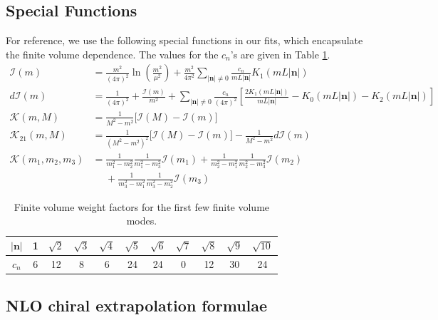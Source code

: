 \documentclass[prd,tightenlines,preprintnumbers,showpacs,superscriptaddress,notitlepage,eqsecnum,floatfix,notitlepage]{revtex4-1}
\begin{document}
\subsection{Special Functions}
For reference, we use the following special functions in our fits, which encapsulate the finite volume dependence. The values for the $c_n$'s are given in Table \ref{tab:cN_weights}.
\begin{align}
\mathcal{I}(m) &= \frac{m^2}{(4\pi)^2} \ln \left( \frac{m^2}{\mu^2} \right)
+ \frac{m^2}{4\pi^2} \sum_{|\mathbf{n}|\neq0} \frac{c_n}{mL|\mathbf{n}|} K_1(mL|\mathbf{n}|) \label{eqn:I(m)} \\
d\mathcal{I}(m) &=
\frac{1}{(4\pi)^2} + \frac{\mathcal{I}(m)}{m^2}
+\sum_{|\mathbf{n}|\neq0} \frac{c_n}{(4\pi)^2} \left[
\frac{2K_1(mL|\mathbf{n}|)}{mL|\mathbf{n}|}
-K_0(mL|\mathbf{n}|)
-K_2(mL|\mathbf{n}|)\right] \\
\mathcal{K}(m,M) &= \frac{1}{M^2 - m^2} \Big[ \mathcal{I}(M) - \mathcal{I}(m) \Big] \\
\mathcal{K}_{21}(m,M) &=
\frac{1}{(M^2 - m^2)^2} \Big[ \mathcal{I}(M) - \mathcal{I}(m) \Big]
-\frac{1}{M^2 - m^2} d\mathcal{I}(m) \\
\mathcal{K}(m_1,m_2,m_3) &= \frac{1}{m_1^2 - m_2^2}\frac{1}{m_1^2-m_3^2} \mathcal{I}(m_1)
+\frac{1}{m_2^2 - m_1^2} \frac{1}{m_2^2 - m_3^2} \mathcal{I}(m_2)
\nonumber\\&\phantom{=}
+\frac{1}{m_3^2 - m_1^2} \frac{1}{m_3^2 - m_2^2} \mathcal{I}(m_3)
\end{align}

\begin{table}
	\begin{ruledtabular}
		\begin{tabular}{c|cccccccccc}
			$|\mathbf{n}|$& 1 & $\sqrt{2}$& $\sqrt{3}$& $\sqrt{4}$& $\sqrt{5}$& $\sqrt{6}$& $\sqrt{7}$& $\sqrt{8}$& $\sqrt{9}$& $\sqrt{10}$\\
			\hline
			$c_n$& 6&12& 8& 6& 24& 24& 0& 12& 30& 24
		\end{tabular}
	\end{ruledtabular}
	\caption{\label{tab:cN_weights}
		Finite volume weight factors for the first few finite volume modes.
	}
\end{table}



\subsection{NLO chiral extrapolation formulae}
\end{document}
